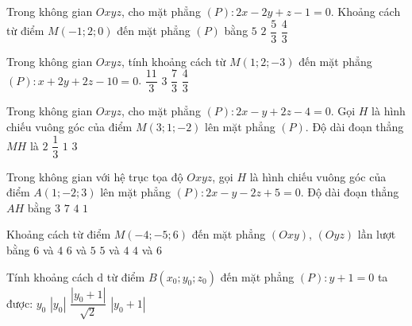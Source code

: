 \begin{ex}%
	Trong không gian $Oxyz$, cho mặt phẳng $(P)\colon 2x-2y+z-1=0$. Khoảng cách từ điểm $M\left(-1;2;0\right)$ đến mặt phẳng $(P)$ bằng
	\choice
	{$5$}
	{$2$}
	{\True $\dfrac{5}{3}$}
	{$\dfrac{4}{3}$}
\end{ex}

\begin{ex}%
	Trong không gian $Oxyz$, tính khoảng cách từ $M\left(1;2;-3\right)$ đến mặt phẳng $(P)\colon x+2y+2z-10=0$.
	\choice
	{\True $\dfrac{11}{3}$}
	{$3$}
	{$\dfrac{7}{3}$}
	{$\dfrac{4}{3}$}
\end{ex}

\begin{ex}%
	Trong không gian $Oxyz$, cho mặt phẳng $(P)\colon 2x-y+2z-4=0$. Gọi $H$ là hình chiếu vuông góc của điểm $M\left(3;1;-2\right)$ lên mặt phẳng $(P)$. Độ dài đoạn thẳng $MH$ là
	\choice
	{$2$}
	{$\dfrac{1}{3}$}
	{\True $1$}
	{$3$}
\end{ex}

\begin{ex}%
	Trong không gian với hệ trục tọa độ $Oxyz$, gọi $H$ là hình chiếu vuông góc của điểm $A(1;-2;3)$ lên mặt phẳng $(P)\colon 2x-y-2z+5=0$. Độ dài đoạn thẳng $AH$ bằng
	\choice
	{$3$}
	{$7$}
	{$4$}
	{$1$}
\end{ex}

\begin{ex}%
	Khoảng cách từ điểm $M(-4;-5;6)$ đến mặt phẳng $(Oxy)$, $(Oyz)$ lần lượt bằng
	\choice
	{\True $6$ và $4$}
	{$6$ và $5$}
	{$5$ và $4$}
	{$4$ và $6$}
\end{ex}

\begin{ex}%
	Tính khoảng cách $\mathrm{d}$ từ điểm $B\left(x_0;y_0;z_0\right)$ đến mặt phẳng $(P)\colon y + 1 = 0$ ta được:
	\choice
	{$y_0$}
	{$\left| y_0\right|$}
	{$\dfrac{\left| y_0+1\right|}{\sqrt{2}}$}
	{\True $\left| y_0+1\right|$}
\end{ex}

